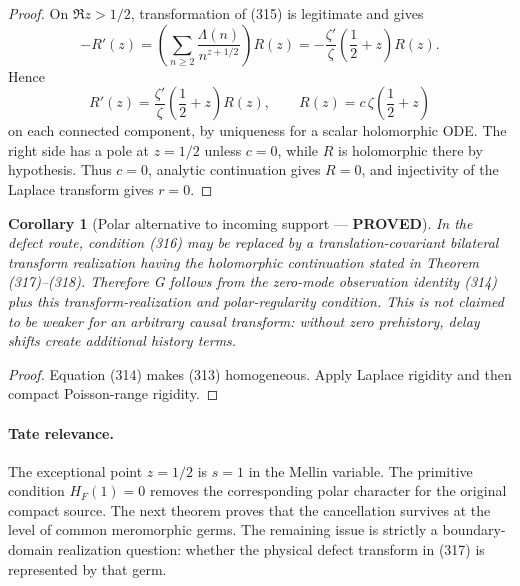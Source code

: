 \documentclass[11pt]{article}
\newtheorem{corollary}[theorem]{Corollary}
\newcommand{\PROVED}{\textcolor{green!45!black}{\textbf{PROVED}}}
\begin{document}
\begin{proof}
On $\Re z>1/2$, transformation of (315) is legitimate and gives
\[
 -R'(z)=
 \left(\sum_{n\ge2}\frac{\Lambda(n)}{n^{z+1/2}}\right)R(z)
 =-\frac{\zeta'}{\zeta}\left(\frac12+z\right)R(z).
\]
Hence
\begin{equation}
 R'(z)=\frac{\zeta'}{\zeta}\left(\frac12+z\right)R(z),
 \qquad
 R(z)=c\,\zeta\left(\frac12+z\right)                  \tag{318}
\end{equation}
on each connected component, by uniqueness for a scalar holomorphic ODE.
The right side has a pole at $z=1/2$ unless $c=0$, while $R$ is holomorphic
there by hypothesis.  Thus $c=0$, analytic continuation gives $R=0$, and
injectivity of the Laplace transform gives $r=0$.
\end{proof}

\begin{corollary}[Polar alternative to incoming support --- \PROVED]
In the defect route, condition (316) may be replaced by a
translation-covariant bilateral transform realization having the holomorphic
continuation stated in Theorem (317)--(318).  Therefore G follows from the
zero-mode observation identity (314) plus this transform-realization and
polar-regularity condition.  This is not claimed to be weaker for an
arbitrary causal transform: without zero prehistory, delay shifts create
additional history terms.
\end{corollary}

\begin{proof}
Equation (314) makes (313) homogeneous.  Apply Laplace rigidity and then
compact Poisson-range rigidity.
\end{proof}

\paragraph{Tate relevance.}
The exceptional point $z=1/2$ is $s=1$ in the Mellin variable.  The
primitive condition $H_F(1)=0$ removes the corresponding polar character
for the original compact source.  The next theorem proves that the
cancellation survives at the level of common meromorphic germs.  The
remaining issue is strictly a boundary-domain realization question: whether
the physical defect transform in (317) is represented by that germ.
\end{document}
